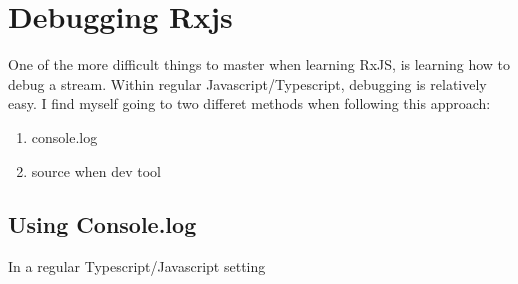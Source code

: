 \chapter{ Debugging Rxjs }
One of the more difficult things to master when learning RxJS, is learning how to debug a stream. Within regular Javascript/Typescript, debugging is relatively easy. I find myself going to two differet methods when following this approach: 
\begin{enumerate}
  \item console.log
  \item source when dev tool
\end{enumerate}

\section{Using Console.log}
In a regular Typescript/Javascript setting 